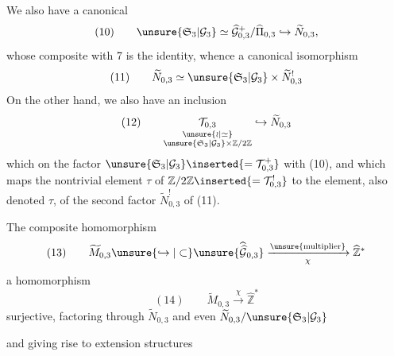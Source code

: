 We also have a canonical 
\[
(10)\qquad\unsure{\mathfrak S_3|\mathcal G_3}\simeq\widehat{\mathcal G}_{0,3}^{+}/\widehat{\Pi}_{0,3}\hookrightarrow\widetilde N_{0,3},
\]
whose composite with 7 is the identity, whence a canonical isomorphism
\[
(11)\qquad\widetilde N_{0,3}\simeq\unsure{\mathfrak S_3|\mathcal G_3}\times\widetilde N_{0,3}^{!}
\]
On the other hand, we also have an inclusion
\[
(12)\qquad
\underset{\substack{\unsure{\wr|\simeq}\\\unsure{\mathfrak S_3|\mathcal G_3}\times\mathbb Z/2\mathbb Z}}{\mathcal T_{0,3}}
\hookrightarrow\widetilde N_{0,3}
\]
which on the factor $\unsure{\mathfrak S_3|\mathcal G_3}\inserted{=\mathcal T_{0,3}^{+}}$  with (10), and which  maps the nontrivial element $\tau$ of $\mathbb Z/2\mathbb Z\inserted{=\mathcal T_{0,3}^{!}}$ to the element, also denoted $\tau$, of the second factor $\widetilde N_{0,3}^{!}$ of (11).


The composite homomorphism
\[
(13)\qquad \widetilde M_{0,3}\unsure{\hookrightarrow|\subset}
\unsure{\widehat{\widehat{\mathcal G}}_{0,3}}
\xrightarrow[\chi]{\text{\unsure{multiplier}}}
\widehat{\mathbb Z}^{*}
\]
 a homomorphism
\[
(14)\qquad \widetilde M_{0,3}\xrightarrow{\chi}\widehat{\mathbb Z}^{*}
\]
surjective, factoring through $\widetilde N_{0,3}$ and even  $\widetilde N_{0,3}/\unsure{\mathfrak S_3|\mathcal G_3}$


and giving rise to extension structures


